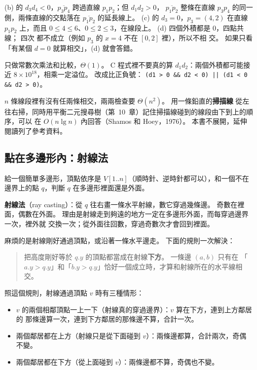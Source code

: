 (b) 的 $d_3 d_4 < 0$，$\overline{p_3 p_4}$ 跨過直線 $p_1 p_2$；但 $d_1 d_2 > 0$，
$\overline{p_1 p_2}$ 整條在直線 $p_3 p_4$ 的同一側，兩條直線的交點落在
$\overline{p_1 p_2}$ 的延長線上。 (c) 的 $d_3 = 0$，$p_3 = (4, 2)$ 在直線 $p_1 p_2$
上，而且 $0 \le 4 \le 6$、$0 \le 2 \le 3$，在線段上。 (d) 四個外積都是 $0$，四點共線；
四次  都不成立（例如 $p_3$ 的 $x = 4$ 不在 $[0, 2]$ 裡），所以不相
交。 如果只看「有某個 $d = 0$ 就算相交」，(d) 就會答錯。

 只做常數次乘法和比較，$\Theta(1)$。 C 程式裡不要真的算
$d_1 d_2$：兩個外積都可能接近 $8 \times 10^{18}$，相乘一定溢位。 改成比正負號：
\texttt{(d1 > 0 \&\& d2 < 0) || (d1 < 0 \&\& d2 > 0)}。

$n$ 條線段裡有沒有任兩條相交，兩兩檢查要 $\Theta(n^2)$。 用一條鉛直的\textbf{掃描線}
從左往右掃，同時用平衡二元搜尋樹（第~10~章）記住掃描線碰到的線段由下到上的順序，可以
在 $O(n \lg n)$ 內回答（Shamos 和 Hoey，1976）。 本書不展開，延伸閱讀列了參考資料。

\subsection{點在多邊形內：射線法}
\label{sec:dc-pip}

給一個簡單多邊形，頂點依序是 $V[1..n]$（順時針、逆時針都可以），和一個不在邊界上的點
$q$，判斷 $q$ 在多邊形裡面還是外面。

\textbf{射線法}（ray casting）：從 $q$ 往右畫一條水平射線，數它穿過幾條邊。 奇數在裡
面，偶數在外面。 理由是射線走到夠遠的地方一定在多邊形外面，而每穿過邊界一次，裡外就
交換一次；從外面往回數，穿過奇數次才會回到裡面。

麻煩的是射線剛好通過頂點，或沿著一條水平邊走。 下面的規則一次解決：

\begin{quote}
把高度剛好等於 $q.y$ 的頂點都當成在射線\textbf{下方}。 一條邊 $(a, b)$ 只有在
「$a.y > q.y$」和「$b.y > q.y$」恰好一個成立時，才算和射線所在的水平線相交。
\end{quote}

照這個規則，射線通過頂點 $v$ 時有三種情形：

\begin{itemize}
\item $v$ 的兩個相鄰頂點一上一下（射線真的穿過邊界）：$v$ 算在下方，連到上方鄰居的
那條邊算一次，連到下方鄰居的那條邊不算，合計一次。
\item 兩個鄰居都在上方（射線只是從下面碰到 $v$）：兩條邊都算，合計兩次，奇偶不變。
\item 兩個鄰居都在下方（從上面碰到 $v$）：兩條邊都不算，奇偶也不變。
\end{itemize}

